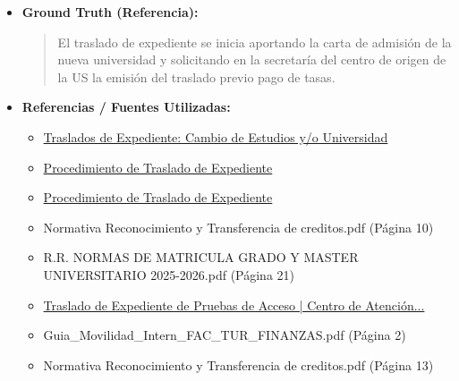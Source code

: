 \documentclass[12pt,a4paper,oneside]{report}
\begin{document}
\begin{itemize}
\begin{itemize}
\begin{quote}
\begin{itemize}
  \item \textbf{Sede Electrónica de la Universidad de Sevilla} (\href{http://sede.us.es}{sede.us.es}): plataforma para realizar trámites administrativos de forma telemática.
  \item \textbf{SEVIUS}: plataforma para gestionar el expediente académico del estudiante.
  \item \textbf{Solicitud Telemática de Traslado de Expediente}: documento que debe rellenar el estudiante para solicitar el traslado de expediente.
  \item \textbf{Carta de Admisión}: documento que acredita la admisión del estudiante en la universidad de destino.
  \item \textbf{Carta de Pago de Tasas Académicas}: documento que acredita el pago de las tasas académicas por traslado de expediente.
\end{itemize}
                \end{quote}
          \item \textbf{{Ground Truth (Referencia):}} \\
                \begin{quote}
El traslado de expediente se inicia aportando la carta de admisión de la nueva universidad y solicitando en la secretaría del centro de origen de la US la emisión del traslado previo pago de tasas.
                \end{quote}
          \item \textbf{{Referencias / Fuentes Utilizadas:}} \\
                \begin{itemize}
                  \item \href{https://cat.us.es/acceso-y-admision/admision-preinscripcion/traslados-de-expediente-cambio-de-estudios-yo-universidad}{Traslados de Expediente: Cambio de Estudios y/o Universidad}
                  \item \href{https://www.etsii.us.es/index.php/secretaria/solicitudes/traslado-expediente}{Procedimiento de Traslado de Expediente}
                  \item \href{https://www.informatica.us.es/index.php/secretaria/solicitudes/traslado-expediente}{Procedimiento de Traslado de Expediente}
                  \item Normativa Reconocimiento y Transferencia de creditos.pdf (Página 10)
                  \item R.R. NORMAS DE MATRICULA GRADO Y MASTER UNIVERSITARIO 2025-2026.pdf (Página 21)
                  \item \href{https://cat.us.es/acceso-y-admision/pruebas-de-acceso/traslado-de-expediente-de-pruebas-de-acceso}{Traslado de Expediente de Pruebas de Acceso | Centro de Atención...}
                  \item Guia\_Movilidad\_Intern\_FAC\_TUR\_FINANZAS.pdf (Página 2)
                  \item Normativa Reconocimiento y Transferencia de creditos.pdf (Página 13)
                \end{itemize}
        \end{itemize}


\end{itemize}
\end{document}
